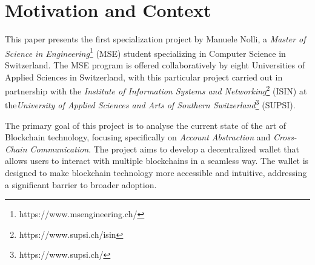 \chapter{Motivation and Context}
\label{chap:motivation_and_context}

This paper presents the first specialization project by Manuele Nolli, a \textit{Master of Science in Engineering}\footnote{https://www.msengineering.ch/} (MSE) student specializing in Computer Science in Switzerland. The MSE program is offered collaboratively by eight Universities of Applied Sciences in Switzerland, with this particular project carried out in partnership with the \textit{Institute of Information Systems and Networking}\footnote{https://www.supsi.ch/isin} (ISIN) at the\textit{University of Applied Sciences and Arts of Southern Switzerland}\footnote{https://www.supsi.ch/} (SUPSI).

The primary goal of this project is to analyse the current state of the art of Blockchain technology, focusing specifically on \textit{Account Abstraction} and \textit{Cross-Chain Communication}. The project aims to develop a decentralized wallet that allows users to interact with multiple blockchains in a seamless way. The wallet is designed to make blockchain technology more accessible and intuitive, addressing a significant barrier to broader adoption.
